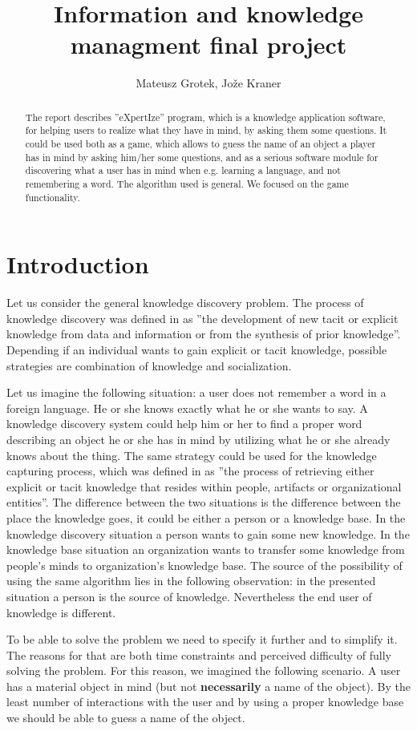 \documentclass[a4paper]{article}
\title{Information and knowledge managment final project }
\author{Mateusz Grotek, Jože Kraner}
\date{}
\begin{document}
\maketitle
\begin{abstract}
The report describes ''eXpertIze'' program, which is a knowledge application software, for helping users to realize what they have in mind, by asking them some questions. It could be used both as a game, which allows to guess the name of an object a player has in mind by asking him/her some questions, and as a serious software module for discovering what a user has in mind when e.g. learning a language, and not remembering a word. The algorithm used is general. We focused on the game functionality.
\end{abstract}
\tableofcontents
\section{Introduction}
Let us consider the general knowledge discovery problem. The process of knowledge discovery was defined in \citet{Memon} as ''the development of new tacit or explicit knowledge from data and information or from the synthesis of prior knowledge''. Depending if an individual wants to gain explicit or tacit knowledge, possible strategies are combination of knowledge and socialization. 

Let us imagine the following situation: a user does not remember a word in a foreign language. He or she knows exactly what he or she wants to say. A knowledge discovery system could help him or her to find a proper word describing an object he or she has in mind by utilizing what he or she already knows about the thing. The same strategy could be used for the knowledge capturing process, which was defined in \citet{Memon} as ''the process of retrieving either explicit or tacit knowledge that resides within people, artifacts or organizational entities''. The difference between the two situations is the difference between the place the knowledge goes, it could be either a person or a knowledge base. In the knowledge discovery situation a person wants to gain some new knowledge. In the knowledge base situation an organization wants to transfer some knowledge from people's minds to organization's knowledge base. The source of the possibility of using the same algorithm lies in the following observation: in the presented situation a person is the source of knowledge. Nevertheless the end user of knowledge is different.

To be able to solve the problem we need to specify it further and to simplify it. The reasons for that are both time constraints and perceived difficulty of fully solving the problem. For this reason, we imagined the following scenario. A user has a material object in mind (but not \textbf{necessarily} a name of the object). By the least number of interactions with the user and by using a proper knowledge base we should be able to guess a name of the object. 
\end{document}
